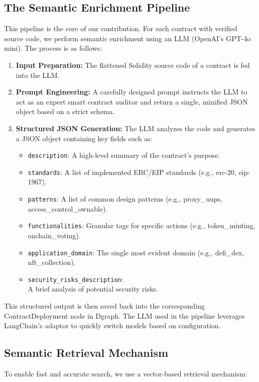 \subsection{The Semantic Enrichment Pipeline}
This pipeline is the core of our contribution. For each contract with verified source code, we perform semantic enrichment using an LLM (OpenAI's GPT-4o mini). The process is as follows:
\begin{enumerate}
	\item \textbf{Input Preparation:} The flattened Solidity source code of a contract is fed into the LLM.
	\item \textbf{Prompt Engineering:} A carefully designed prompt instructs the LLM to act as an expert smart contract auditor and return a single, minified JSON object based on a strict schema.
	\item \textbf{Structured JSON Generation:} The LLM analyzes the code and generates a JSON object containing key fields such as:
	      \begin{itemize}
		      \item \texttt{description}: A high-level summary of the contract's purpose.
		      \item \texttt{standards}: A list of implemented ERC/EIP standards (e.g., erc-20, eip-1967).
		      \item \texttt{patterns}: A list of common design patterns (e.g., proxy\_uups, access\_control\_ownable).
		      \item \texttt{functionalities}: Granular tags for specific actions (e.g., token\_minting, onchain\_voting).
		      \item \texttt{application\_domain}: The single most evident domain (e.g., defi\_dex, nft\_collection).
		      \item \texttt{security\_risks\_description}: \\A brief analysis of potential security risks.
	      \end{itemize}
\end{enumerate}

This structured output is then saved back into the corresponding ContractDeployment node in Dgraph. The LLM used in the pipeline leverages LangChain's adaptor to quickly switch models based on configuration.

\subsection{Semantic Retrieval Mechanism}
To enable fast and accurate search, we use a vector-based retrieval mechanism:


